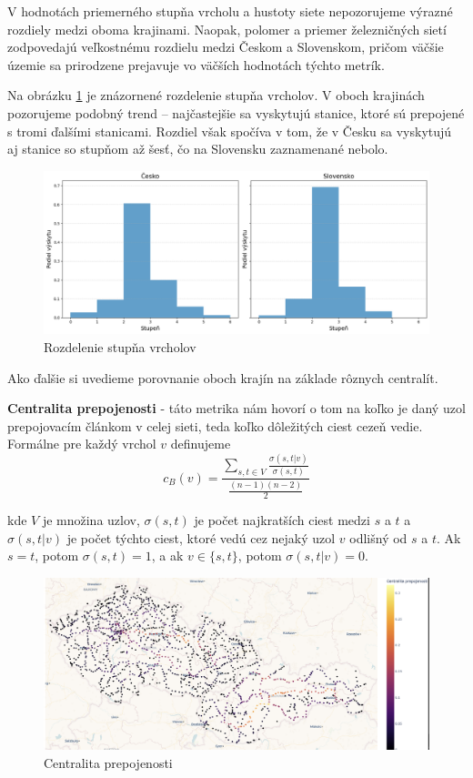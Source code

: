 \documentclass[main.tex]{subfiles}
\begin{document}
V hodnotách priemerného stupňa vrcholu a hustoty siete nepozorujeme výrazné rozdiely medzi oboma krajinami. Naopak, polomer a priemer železničných sietí zodpovedajú veľkostnému rozdielu medzi Českom a Slovenskom, pričom väčšie územie sa prirodzene prejavuje vo väčších hodnotách týchto metrík.

Na obrázku \ref{obr:degree_distrib} je znázornené rozdelenie stupňa vrcholov. V oboch krajinách pozorujeme podobný trend – najčastejšie sa vyskytujú stanice, ktoré sú prepojené s tromi ďalšími stanicami. Rozdiel však spočíva v tom, že v Česku sa vyskytujú aj stanice so stupňom až šesť, čo na Slovensku zaznamenané nebolo.

\begin{figure}
    \centerline{\includegraphics[width=1.2\textwidth]{images/degree_distrib.png}}
    \caption{Rozdelenie stupňa vrcholov}
    \label{obr:degree_distrib}
\end{figure}

Ako ďalšie si uvedieme porovnanie oboch krajín na základe rôznych centralít.

\textbf{Centralita prepojenosti} - táto metrika nám hovorí o tom na koľko je daný uzol prepojovacím článkom v celej sieti, teda koľko dôležitých ciest cezeň vedie. Formálne pre každý vrchol $v$ definujeme 
\begin{equation*}
    c_B(v) =\frac{\sum_{s,t \in V} \frac{\sigma(s, t|v)}{\sigma(s, t)}}{\frac{(n-1)(n-2)}{2}}
\end{equation*}

kde $V$ je množina uzlov, $\sigma(s, t)$ je počet najkratších ciest medzi $s$ a $t$ a $\sigma(s, t |v)$ je počet týchto ciest, ktoré vedú cez nejaký uzol $v$ odlišný od $s$ a $t$. Ak $s = t$, potom $\sigma(s, t) = 1$, a ak $v \in \{s, t \}$, potom $\sigma(s, t |v ) = 0$. 

\begin{figure}
    \centerline{\includegraphics[width=1.2\textwidth]{images/betweenes.png}}
    \caption{Centralita prepojenosti}
    \label{obr:betweenes}
\end{figure}
\end{document}
